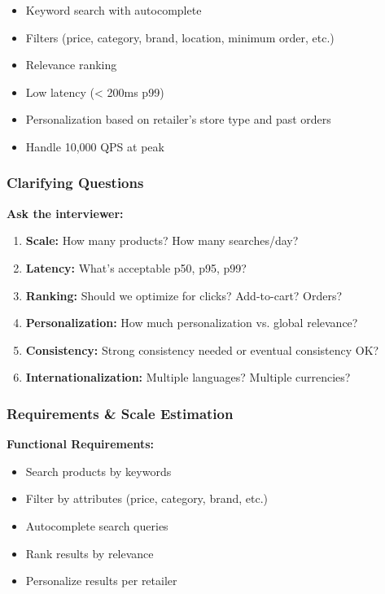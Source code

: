 \documentclass[11pt,letterpaper]{article}
\begin{document}
\begin{itemize}
    \item Keyword search with autocomplete
    \item Filters (price, category, brand, location, minimum order, etc.)
    \item Relevance ranking
    \item Low latency (< 200ms p99)
    \item Personalization based on retailer's store type and past orders
    \item Handle 10,000 QPS at peak
\end{itemize}

\subsubsection{Clarifying Questions}

\textbf{Ask the interviewer:}

\begin{enumerate}
    \item \textbf{Scale:} How many products? How many searches/day?
    \item \textbf{Latency:} What's acceptable p50, p95, p99?
    \item \textbf{Ranking:} Should we optimize for clicks? Add-to-cart? Orders?
    \item \textbf{Personalization:} How much personalization vs. global relevance?
    \item \textbf{Consistency:} Strong consistency needed or eventual consistency OK?
    \item \textbf{Internationalization:} Multiple languages? Multiple currencies?
\end{enumerate}

\subsubsection{Requirements \& Scale Estimation}

\textbf{Functional Requirements:}
\begin{itemize}
    \item Search products by keywords
    \item Filter by attributes (price, category, brand, etc.)
    \item Autocomplete search queries
    \item Rank results by relevance
    \item Personalize results per retailer
\end{itemize}
\end{document}
